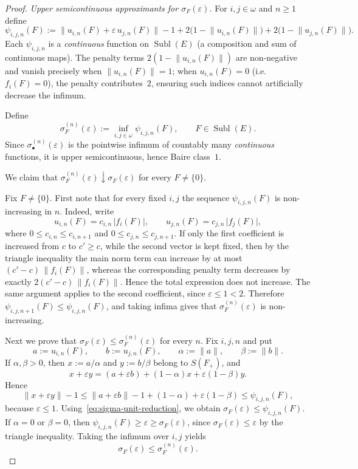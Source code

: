 \documentclass[12pt]{amsart}
\renewcommand{\le}{\leqslant}
\renewcommand{\ge}{\geqslant}
\theoremstyle{plain}
\theoremstyle{definition}
\theoremstyle{remark}
\DeclareMathOperator{\Subl}{Subl}
\begin{document}
\begin{proof}
\smallskip
\emph{Upper semicontinuous approximants for $\sigma_F(\varepsilon)$.}
For $i, j \in \omega$ and $n \ge 1$ define
\[
    \psi_{i,j,n}(F)
    := \lVert u_{i,n}(F) + \varepsilon\, u_{j,n}(F) \rVert - 1
    + 2\bigl(1 - \lVert u_{i,n}(F) \rVert\bigr)
    + 2\bigl(1 - \lVert u_{j,n}(F) \rVert\bigr).
\]
Each $\psi_{i,j,n}$ is a \emph{continuous} function on $\Subl(E)$ (a
composition and sum of continuous maps).  The penalty terms
$2(1 - \lVert u_{i,n}(F) \rVert)$ are non-negative and vanish precisely when
$\lVert u_{i,n}(F) \rVert = 1$; when $u_{i,n}(F) = 0$ (i.e.\ $f_i(F) = 0$),
the penalty contributes~$2$, ensuring such indices cannot artificially decrease
the infimum.

Define
\[
    \sigma^{(n)}_F(\varepsilon)
    := \inf_{i,j \in \omega} \psi_{i,j,n}(F), \qquad F \in \Subl(E).
\]
Since $\sigma^{(n)}_\bullet(\varepsilon)$ is the pointwise infimum of countably
many \emph{continuous} functions, it is upper semicontinuous, hence Baire
class~$1$.

We claim that $\sigma^{(n)}_F(\varepsilon) \downarrow \sigma_F(\varepsilon)$
for every $F \ne \{0\}$.

Fix $F \ne \{0\}$.  First note that for every fixed $i,j$ the sequence
$\psi_{i,j,n}(F)$ is non-increasing in $n$.
Indeed, write
\[
    u_{i,n}(F) = c_{i,n}\,\lvert f_i(F) \rvert,
    \qquad
    u_{j,n}(F) = c_{j,n}\,\lvert f_j(F) \rvert,
\]
where $0 \le c_{i,n} \le c_{i,n+1}$ and
$0 \le c_{j,n} \le c_{j,n+1}$.
If only the first coefficient is increased from $c$ to $c' \ge c$, while
the second vector is kept fixed, then by the triangle inequality the main norm
term can increase by at most
$(c'-c)\,\lVert f_i(F) \rVert$, whereas the corresponding penalty term
decreases by exactly
$2(c'-c)\,\lVert f_i(F) \rVert$.
Hence the total expression does not increase.
The same argument applies to the second coefficient, since
$\varepsilon \le 1 < 2$.
Therefore $\psi_{i,j,n+1}(F) \le \psi_{i,j,n}(F)$, and taking infima gives that
$\sigma^{(n)}_F(\varepsilon)$ is non-increasing.

Next we prove that
$\sigma_F(\varepsilon) \le \sigma^{(n)}_F(\varepsilon)$ for every $n$.
Fix $i,j,n$ and put
\[
    a := u_{i,n}(F), \qquad b := u_{j,n}(F), \qquad
    \alpha := \lVert a \rVert, \qquad \beta := \lVert b \rVert.
\]
If $\alpha,\beta > 0$, then
$x := a/\alpha$ and $y := b/\beta$ belong to $S(F_+)$, and
\[
    x + \varepsilon y
    = (a + \varepsilon b)
      + (1-\alpha)x
      + \varepsilon(1-\beta)y.
\]
Hence
\[
    \lVert x + \varepsilon y \rVert - 1
    \le \lVert a + \varepsilon b \rVert - 1
      + (1-\alpha) + \varepsilon(1-\beta)
    \le \psi_{i,j,n}(F),
\]
because $\varepsilon \le 1$.
Using~\eqref{eq:sigma-unit-reduction}, we obtain
$\sigma_F(\varepsilon) \le \psi_{i,j,n}(F)$.
If $\alpha=0$ or $\beta=0$, then
$\psi_{i,j,n}(F) \ge \varepsilon \ge \sigma_F(\varepsilon)$, since
$\sigma_F(\varepsilon) \le \varepsilon$ by the triangle inequality.
Taking the infimum over $i,j$ yields
\[
    \sigma_F(\varepsilon) \le \sigma^{(n)}_F(\varepsilon).
\]


\end{proof}
\end{document}
